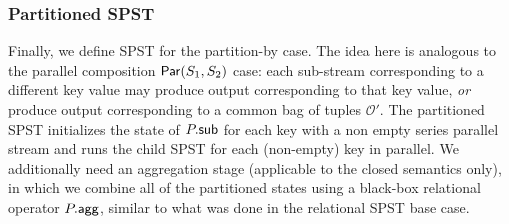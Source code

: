 

\subsubsection{Partitioned SPST}

Finally, we define SPST for the partition-by case.
The idea here is analogous to the parallel composition $\mathsf{Par}({{S}_1}, {{S}_2})$ case: each sub-stream corresponding to a different key value may produce output corresponding to that key value, \emph{or} produce output corresponding to a common bag of tuples $\mathcal{O}'$.
The partitioned SPST initializes the state of ${P}.{\mathsf{sub}}$ for each key with a non empty series parallel stream and runs the child SPST for each (non-empty) key in parallel.
We additionally need an aggregation stage (applicable to the closed semantics only),
in which we combine all of the partitioned states
using a black-box relational operator ${P}.{\mathsf{agg}}$,
similar to what was done in the relational SPST base case.

